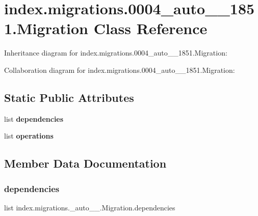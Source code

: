 \hypertarget{classindex_1_1migrations_1_10004__auto__20171010__1851_1_1Migration}{}\section{index.\+migrations.0004\+\_\+auto\+\_\+\_\+1851.Migration Class Reference}
\label{classindex_1_1migrations_1_10004__auto__20171010__1851_1_1Migration}


Inheritance diagram for index.\+migrations.0004\+\_\+auto\+\_\+\_\+1851.Migration\+:


Collaboration diagram for index.\+migrations.0004\+\_\+auto\+\_\+\_\+1851.Migration\+:
\subsection*{Static Public Attributes}
\begin{DoxyCompactItemize}
\item 
list {\bfseries dependencies}
\item 
list {\bfseries operations}
\end{DoxyCompactItemize}


\subsection{Member Data Documentation}
\mbox{\label{classindex_1_1migrations_1_10004__auto__20171010__1851_1_1Migration_ac2bdde18d38b8818275bb902af5c3683}} 
\subsubsection{\texorpdfstring{dependencies}{dependencies}}
{\footnotesize\ttfamily list index.\+migrations.\+\_\+auto\+\_\+\_.\+Migration.\+dependencies\hspace{0.3cm}{\ttfamily [static]}}

